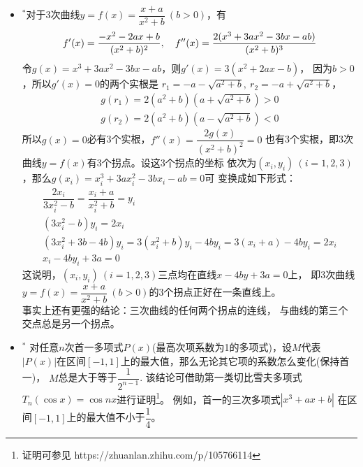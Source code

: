 \begin{itemize}[leftmargin=\inteval{\myitemleftmargin}pt,itemsep=
   \inteval{\myitemitempsep}pt,topsep=\inteval{\myitemtopsep}pt]
\item $ ^* $对于3次曲线$ y=f(x)=\dfrac{x+a}{x^2+b}\ (b>0) $，有
\begin{gather*}
    f'(x)=\dfrac{-x^2-2ax+b}{(x^2+b)^2},\quad 
    f''(x)=\dfrac{2(x^3+3ax^2-3bx-ab)}{(x^2+b)^3}
\end{gather*}
令$ g(x)=x^3+3ax^2-3bx-ab $，则$ g'(x)=3(x^2+2ax-b) $，
因为$ b>0 $，所以$ g'(x)=0 $的两个实根是
$ r_1=-a-\sqrt{a^2+b},\ r_2=-a+\sqrt{a^2+b} $，
\begin{gather*}
    g(r_1)=2(a^2+b)\left(a+\sqrt{a^2+b}\right)>0 \\
    g(r_2)=2(a^2+b)\left(a-\sqrt{a^2+b}\right)<0 
\end{gather*}
所以$ g(x)=0 $必有3个实根，$ f''(x)=\dfrac{2g(x)}{(x^2+b)^2}=0 $
也有3个实根，即3次曲线$ y=f(x) $有3个拐点。设这3个拐点的坐标
依次为$ (x_i,y_i)\ (i=1,2,3) $，那么$ g(x_i)=x_i^3+3ax_i^2-3bx_i-ab=0 $可
变换成如下形式：
\begin{gather*}
    \dfrac{2x_i}{3x_i^2-b}=\dfrac{x_i+a}{x_i^2+b}=y_i \\
    (3x_i^2-b)y_i=2x_i \\
    (3x_i^2+3b-4b)y_i=3(x_i^2+b)y_i-4by_i=3(x_i+a)-4by_i=2x_i \\
    x_i-4by_i+3a=0
\end{gather*}
这说明，$ (x_i,y_i)\ (i=1,2,3) $三点均在直线$ x-4by+3a=0 $上，
即3次曲线$ y=f(x)=\dfrac{x+a}{x^2+b}\ (b>0) $的3个拐点正好在一条直线上。\\
事实上还有更强的结论：三次曲线的任何两个拐点的连线，
与曲线的第三个交点总是另一个拐点。

\item $^*$ 对任意$ n $次首一多项式$ P(x) $(最高次项系数为1的多项式)，设$ M $代表
$ |P(x)| $在区间$ [-1,1] $上的最大值，那么无论其它项的系数怎么变化(保持首一)，
$ M $总是大于等于$ \dfrac{1}{2^{n-1}} $. 该结论可借助第一类切比雪夫多项式
$ T_n(\cos x)=\cos nx $进行证明\footnote{证明可参见
    https://zhuanlan.zhihu.com/p/105766114 }。
例如，首一的三次多项式$ |x^3+ax+b| $
在区间$ [-1,1] $上的最大值不小于$ \dfrac{1}{4} $。\\

\end{itemize}


